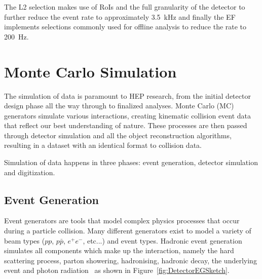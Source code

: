 The L2 selection makes use of RoIs and the full granularity of the detector to further reduce the event rate to approximately \SI{3.5}{\kHz} and finally the EF implements selections commonly used for offline analysis to reduce the rate to \SI{200}{\Hz}.

\section{Monte Carlo Simulation} \label{DetectorMC}

The simulation of data is paramount to HEP research, from the initial detector design phase all the way through to finalized analyses. Monte Carlo (MC) generators simulate various interactions, creating kinematic collision event data that reflect our best understanding of nature. These processes are then passed through detector simulation and all the object reconstruction algorithms, resulting in a dataset with an identical format to collision data. 

Simulation of data happens in three phases: event generation, detector simulation and digitization. 

\subsection{Event Generation} \label{DetectorEventGeneration}

Event generators are tools that model complex physics processes that occur during a particle collision. Many different generators exist to model a variety of beam types ($pp$, $p\bar{p}$, $e^+e^-$, etc...) and event types. Hadronic event generation simulates all components which make up the interaction, namely the hard scattering process, parton showering, hadronising, hadronic decay, the underlying event and photon radiation~\cite{Les} as shown in Figure~\ref{fig:DetectorEGSketch}.

